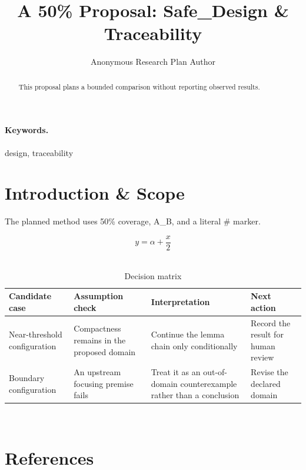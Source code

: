\documentclass{article}
\title{A 50\% Proposal: Safe\_Design \& Traceability}
\author{Anonymous Research Plan Author}
\begin{document}
\maketitle
\begin{abstract}
This proposal plans a bounded comparison without reporting observed results.
\end{abstract}
\paragraph{Keywords.} design, traceability
\section{Introduction \& Scope}
The planned method uses 50\% coverage, A\_B, and a literal \# marker.~\cite{cite_example_1}

\begin{equation}
y = \alpha + \frac{x}{2}
\label{eq:introduction-B2}
\end{equation}~\cite{cite_example_1}

\begin{table}[htbp]
\centering
\footnotesize
\setlength{\tabcolsep}{3pt}
\renewcommand{\arraystretch}{1.12}
\caption{Decision matrix}
\label{tab:introduction-B3}
\begin{tabular}{|p{}|p{}|p{}|p{}|}
\hline
Candidate case & Assumption check & Interpretation & Next action \\\hline
Near-threshold configuration & Compactness remains in the proposed domain & Continue the lemma chain only conditionally & Record the result for human review \\\hline
Boundary configuration & An upstream focusing premise fails & Treat it as an out-of-domain counterexample rather than a conclusion & Revise the declared domain \\\hline
\end{tabular}
\end{table}~\cite{cite_example_1}
\section*{References}


\end{document}
